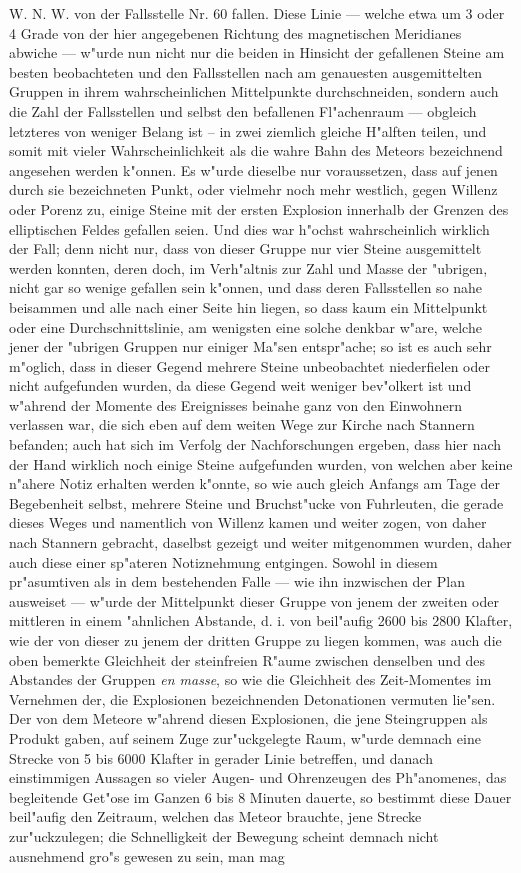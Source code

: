 \documentclass[a4paper, 11pt, oneside, german]{article}
\begin{document}
W. N. W. von der Fallsstelle Nr. 60 fallen. Diese Linie --- welche etwa um 3 oder 4 Grade von der hier angegebenen Richtung des magnetischen Meridianes abwiche --- w"urde nun nicht nur die beiden in Hinsicht der gefallenen Steine am besten beobachteten und den Fallsstellen nach am genauesten ausgemittelten Gruppen in ihrem wahrscheinlichen Mittelpunkte durchschneiden, sondern auch die Zahl der Fallsstellen und selbst den befallenen Fl"achenraum --- obgleich letzteres von weniger Belang ist -- in zwei ziemlich gleiche H"alften teilen, und somit mit vieler Wahrscheinlichkeit als die wahre Bahn des Meteors bezeichnend angesehen werden k"onnen. Es w"urde dieselbe nur voraussetzen, dass auf jenen durch sie bezeichneten Punkt, oder vielmehr noch mehr westlich, gegen Willenz oder Porenz zu, einige Steine mit der ersten Explosion innerhalb der Grenzen des elliptischen Feldes gefallen seien. Und dies war h"ochst wahrscheinlich wirklich der Fall; denn nicht nur, dass von dieser Gruppe nur vier Steine ausgemittelt werden konnten, deren doch, im Verh"altnis zur Zahl und Masse der "ubrigen, nicht gar so wenige gefallen sein k"onnen, und dass deren Fallsstellen so nahe beisammen und alle nach einer Seite hin liegen, so dass kaum ein Mittelpunkt oder eine Durchschnittslinie, am wenigsten eine solche denkbar w"are, welche jener der "ubrigen Gruppen nur einiger Ma"sen entspr"ache; so ist es auch sehr m"oglich, dass in dieser Gegend mehrere Steine unbeobachtet niederfielen oder nicht aufgefunden wurden, da diese Gegend weit weniger bev"olkert ist und w"ahrend der Momente des Ereignisses beinahe ganz von den Einwohnern verlassen war, die sich eben auf dem weiten Wege zur Kirche nach Stannern befanden; auch hat sich im Verfolg der Nachforschungen ergeben, dass hier nach der Hand wirklich noch einige Steine aufgefunden wurden, von welchen aber keine n"ahere Notiz erhalten werden k"onnte, so wie auch gleich Anfangs am Tage der Begebenheit selbst, mehrere Steine und Bruchst"ucke von Fuhrleuten, die gerade dieses Weges und namentlich von Willenz kamen und weiter zogen, von daher nach Stannern gebracht, daselbst gezeigt und weiter mitgenommen wurden, daher auch diese einer sp"ateren Notiznehmung entgingen. Sowohl in diesem pr"asumtiven als in dem bestehenden Falle --- wie ihn inzwischen der Plan ausweiset --- w"urde der Mittelpunkt dieser Gruppe von jenem der zweiten oder mittleren in einem "ahnlichen Abstande, d. i. von beil"aufig 2600 bis 2800 Klafter, wie der von dieser zu jenem der dritten Gruppe zu liegen kommen, was auch die oben bemerkte Gleichheit der steinfreien R"aume zwischen denselben und des Abstandes der Gruppen \emph{en masse}, so wie die Gleichheit des Zeit-Momentes im Vernehmen der, die Explosionen bezeichnenden Detonationen vermuten lie"sen. Der von dem Meteore w"ahrend diesen Explosionen, die jene Steingruppen als Produkt gaben, auf seinem Zuge zur"uckgelegte Raum, w"urde demnach eine Strecke von 5 bis 6000 Klafter in gerader Linie betreffen, und danach einstimmigen Aussagen so vieler Augen- und Ohrenzeugen des Ph"anomenes, das begleitende Get"ose im Ganzen 6 bis 8 Minuten dauerte, so bestimmt diese Dauer beil"aufig den Zeitraum, welchen das Meteor brauchte, jene Strecke zur"uckzulegen; die Schnelligkeit der Bewegung scheint demnach nicht ausnehmend gro"s gewesen zu sein, man mag 
\end{document}
